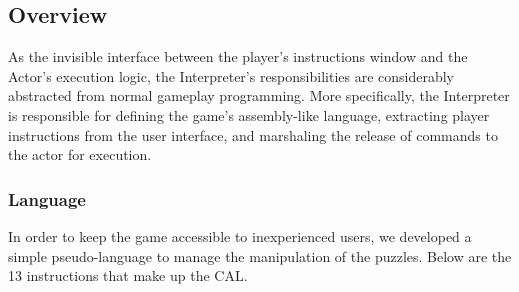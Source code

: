 \subsection{Overview}
As the invisible interface between the player's instructions window and the Actor's 
execution logic, the Interpreter's responsibilities are considerably abstracted from 
normal gameplay programming. More specifically, the Interpreter is responsible for 
defining the game's assembly-like language, extracting player instructions from the 
user interface, and marshaling the release of commands to the actor for execution.\\

\subsubsection{Language}
In order to keep the game accessible to inexperienced users, we developed a simple
pseudo-language to manage the manipulation of the puzzles. Below are the 13 instructions that 
make up the CAL.

